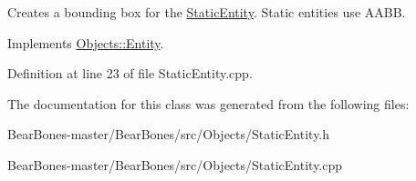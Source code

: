 Creates a bounding box for the \hyperlink{class_objects_1_1_static_entity}{Static\+Entity}. Static entities use A\+A\+BB. 

Implements \hyperlink{class_objects_1_1_entity_a3fc51fcad3f731410589f7ab0e3dbe7e}{Objects\+::\+Entity}.



Definition at line 23 of file Static\+Entity.\+cpp.



The documentation for this class was generated from the following files\+:\begin{DoxyCompactItemize}
\item 
Bear\+Bones-\/master/\+Bear\+Bones/src/\+Objects/Static\+Entity.\+h\item 
Bear\+Bones-\/master/\+Bear\+Bones/src/\+Objects/Static\+Entity.\+cpp\end{DoxyCompactItemize}
